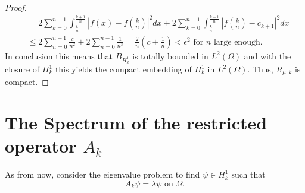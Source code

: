 \begin{theorem}
\begin{proof}
\begin{align*}
				& =  2 \sum_{k = 0}^{n-1} \int_{\frac{k}{n}}^{\frac{k+1}{n}} | f(x) - f(\frac{k}{n}) |^{2} dx +  2 \sum_{k = 0}^{n-1} \int_{\frac{k}{n}}^{\frac{k+1}{n}} | f(\frac{k}{n}) - c_{k+1} |^{2} dx \\
				& \leq 2 \sum_{n = 0}^{n-1} \frac{c}{n^{2}} + 2 \sum_{n=0}^{n-1} \frac{1}{n^{3}} = \frac{2}{n} \left( c + \frac{1}{n} \right) < \epsilon^{2} \text{ for } n \text{ large enough.}
		\end{align*}		 
	In conclusion this means that $B_{H^{1}_{k}}$ is totally bounded in $L^{2}(\Omega)$ and with the closure of $H^{1}_{k}$ this yields the compact embedding of $H^{1}_{k}$ in $L^{2}(\Omega)$. Thus, $R_{\mu, k}$ is compact. %
	\end{proof}	
\end{theorem}		

\section{The Spectrum of the restricted operator \texorpdfstring{$A_{k}$}{Ak}}	%
As from now, consider the eigenvalue problem to find $\psi \in H^{1}_{k}$ such that
	\begin{equation}
		A_{k} \psi = \lambda \psi \text{ on } \Omega. \label{eigv-problem}
	\end{equation}
	

